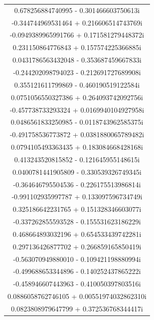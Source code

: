\documentclass[12pt,a4paper,UTF8]{ctexart}
\begin{document}
\begin{enumerate}
\begin{longtable}{c}
              0.678256884740995      -   0.301466603750613i   \\
              -0.344744969531464     +   0.216606514743769i   \\
              -0.0949389965991766    +   0.171581279448372i   \\
              0.231150864776843      +   0.157574225366885i   \\
              0.0431786563432048     -   0.353687459667833i   \\
              -0.244202098794023     -   0.212691727689908i   \\
              0.355121611799869      -   0.460190519122584i   \\
              0.0751056550327386     +   0.264093742092756i   \\
              -0.457738733293324     +   0.0169940104927958i  \\
              0.0486561833250985     -   0.0118743962585375i  \\
              -0.491758536773872     +   0.0381880065789482i  \\
              0.0794105493363435     +   0.183084668428168i   \\
              0.413243520815852      -   0.121645955148615i   \\
              0.0400781441905809     -   0.330539326749345i   \\
              -0.364646795504536     -   0.226175513986814i   \\
              -0.991102935997787     +   0.133097596734749i   \\
              0.325186642231765      +   0.151328346603077i   \\
              -0.337262855593528     -   0.155531623186229i   \\
              0.468664893032196      +   0.654533439742281i   \\
              0.297136426877702      +   0.266859165850419i   \\
              -0.563070949880010     -   0.109421198880994i   \\
              -0.499688653344896     -   0.140252437865222i   \\
              -0.458946607443963     -   0.410050397803516i   \\
              0.0886058762746105     +   0.00551974032862310i \\
              0.0823808979647799     +   0.372536768344417i   \\

\end{longtable}
\end{enumerate}
\end{document}
